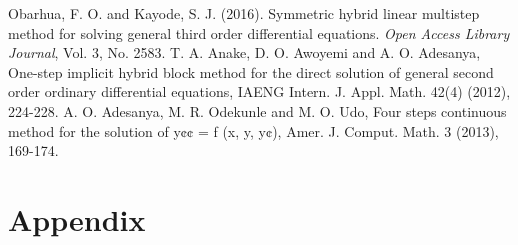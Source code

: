 \documentclass[12pt]{report}
\begin{document}
\begin{thebibliography}{99}
	Obarhua, F. O. and Kayode, S. J. (2016). Symmetric hybrid linear multistep method for solving general third order differential equations. \textit{Open Access Library Journal}, Vol. 3, No. 2583.
	T. A. Anake, D. O. Awoyemi and A. O. Adesanya, One-step implicit hybrid block method for the direct solution of general second order ordinary differential equations, IAENG Intern. J. Appl. Math. 42(4) (2012), 224-228.
	A. O. Adesanya, M. R. Odekunle and M. O. Udo, Four steps continuous method for the solution of y¢¢ = f (x, y, y¢), Amer. J. Comput. Math. 3 (2013), 169-174.
\end{thebibliography}




\chapter*{Appendix}
\end{document}
